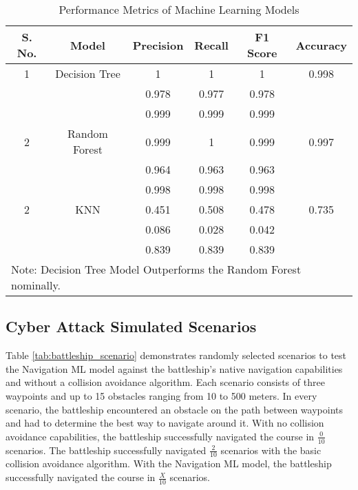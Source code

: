 \documentclass[conference]{IEEEtran}
\begin{document}
\begin{table}[ht]
\centering
\caption{Performance Metrics of Machine Learning Models}
\label{tab:sec_performance}
\begin{tabular}{@{}cccccc@{}}
\toprule
S. No. & Model         & Precision      & Recall         & F1 Score       & Accuracy \\ \midrule
1      & Decision Tree & 1              & 1              & 1              & 0.998 \\
       &               & 0.978          & 0.977          & 0.978          & \\
       &               & 0.999          & 0.999          & 0.999          & \\
2      & Random Forest & 0.999          & 1              & 0.999          & 0.997 \\
       &               & 0.964          & 0.963          & 0.963          & \\
       &               & 0.998          & 0.998          & 0.998          & \\
2      & KNN           & 0.451          & 0.508          & 0.478          & 0.735 \\
       &               & 0.086          & 0.028          & 0.042          & \\
       &               & 0.839          & 0.839          & 0.839          & \\
\bottomrule
\multicolumn{6}{l}{\footnotesize Note: Decision Tree Model Outperforms the Random Forest nominally.}
\end{tabular}
\end{table}

\subsection{Cyber Attack Simulated Scenarios}
Table \ref{tab:battleship_scenario} demonstrates randomly selected scenarios to test the Navigation ML model against the battleship's native navigation capabilities and without a collision avoidance algorithm. Each scenario consists of three waypoints and up to 15 obstacles ranging from 10 to 500 meters. In every scenario, the battleship encountered an obstacle on the path between waypoints and had to determine the best way to navigate around it. With no collision avoidance capabilities, the battleship successfully navigated the course in \(\frac{0}{10}\) scenarios. The battleship successfully navigated \(\frac{2}{10}\) scenarios with the basic collision avoidance algorithm. With the Navigation ML model, the battleship successfully navigated the course in \(\frac{X}{10}\) scenarios.
\end{document}
